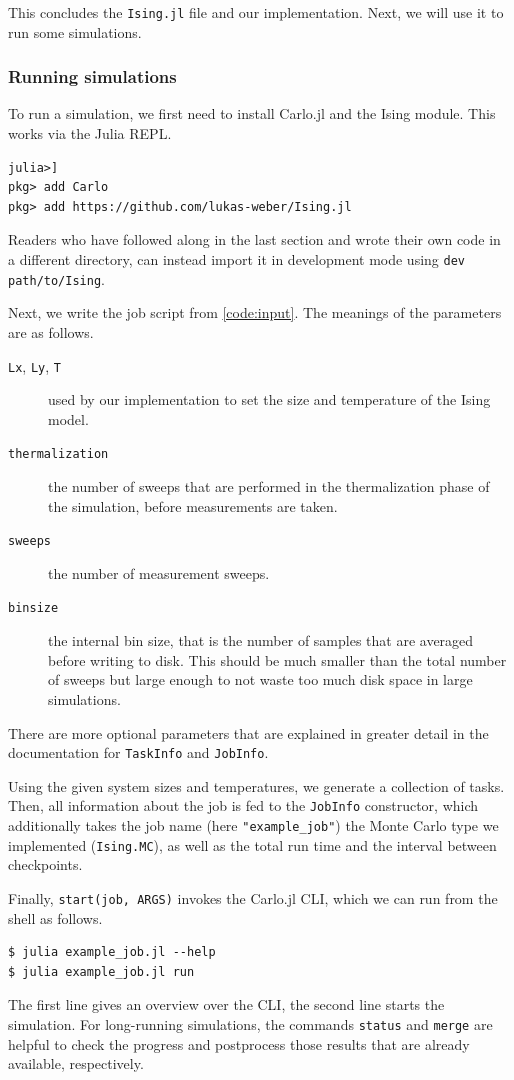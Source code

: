 \documentclass{SciPost}
\begin{document}
This concludes the \texttt{Ising.jl} file and our implementation. Next, we will use it to run some simulations.

\subsubsection{Running simulations}
\label{sec:runising}
To run a simulation, we first need to install Carlo.jl and the Ising module. This works via the Julia REPL.
\begin{lstlisting}
julia>]
pkg> add Carlo
pkg> add https://github.com/lukas-weber/Ising.jl
\end{lstlisting}
Readers who have followed along in the last section and wrote their own code in a different directory, can instead import it in development mode using \texttt{dev path/to/Ising}.

Next, we write the job script from \cref{code:input}. The meanings of the parameters are as follows.
\begin{description}
\item[\texttt{Lx}, \texttt{Ly}, \texttt{T}] used by our implementation to set the size and temperature of the Ising model.
\item[\texttt{thermalization}] the number of sweeps that are performed in the thermalization phase of the simulation, before measurements are taken.
\item[\texttt{sweeps}] the number of measurement sweeps.
\item[\texttt{binsize}] the internal bin size, that is the number of samples that are averaged before writing to disk. This should be much smaller than the total number of sweeps but large enough to not waste too much disk space in large simulations.
\end{description}
There are more optional parameters that are explained in greater detail in the documentation for \texttt{TaskInfo} and \texttt{JobInfo}.

Using the given system sizes and temperatures, we generate a collection of tasks. Then, all information about the job is fed to the \texttt{JobInfo} constructor, which additionally takes the job name (here \texttt{"example\_{}job"}) the Monte Carlo type we implemented (\texttt{Ising.MC}), as well as the total run time and the interval between checkpoints.

Finally, \texttt{start(job, ARGS)} invokes the Carlo.jl CLI, which we can run from the shell as follows.
\begin{lstlisting}
$ julia example_job.jl --help
$ julia example_job.jl run
\end{lstlisting}
The first line gives an overview over the CLI, the second line starts the simulation.
For long-running simulations, the commands \texttt{status} and \texttt{merge} are helpful to check the progress and postprocess those results that are already available, respectively.
\end{document}
